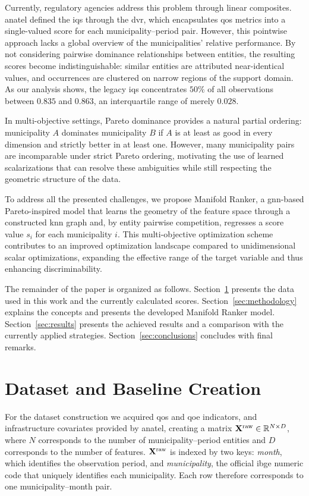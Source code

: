 \documentclass[english]{sbrt}
\begin{document}
Currently, regulatory agencies address this problem through linear composites. \gls{anatel} defined the \gls{iqs} through the \gls{dvr}, which encapsulates \gls{qos} metrics into a single-valued score for each municipality--period pair. However, this pointwise approach lacks a global overview of the municipalities' relative performance. By not considering pairwise dominance relationships between entities, the resulting scores become indistinguishable: similar entities are attributed near-identical values, and occurrences are clustered on narrow regions of the support domain. As our analysis shows, the legacy \gls{iqs} concentrates $50\%$ of all observations between $0.835$ and $0.863$, an interquartile range of merely $0.028$.

In multi-objective settings, Pareto dominance provides a natural partial ordering: municipality $A$ dominates municipality $B$ if $A$ is at least as good in every dimension and strictly better in at least one. However, many municipality pairs are incomparable under strict Pareto ordering, motivating the use of learned scalarizations that can resolve these ambiguities while still respecting the geometric structure of the data.

To address all the presented challenges, we propose Manifold Ranker, a \gls{gnn}-based Pareto-inspired model that learns the geometry of the feature space through a constructed \gls{knn} graph and, by entity pairwise competition, regresses a score value $s_i$ for each municipality $i$. This multi-objective optimization scheme contributes to an improved optimization landscape compared to unidimensional scalar optimizations, expanding the effective range of the target variable and thus enhancing discriminability.

The remainder of the paper is organized as follows.
Section~\ref{sec:dataset} presents the data used in this work and the currently calculated scores.
Section~\ref{sec:methodology} explains the concepts and presents the developed Manifold Ranker model.
Section~\ref{sec:results} presents the achieved results and a comparison with the currently applied strategies.
Section~\ref{sec:conclusions} concludes with final remarks.


\section{Dataset and Baseline Creation} \label{sec:dataset}

For the dataset construction we acquired \gls{qos} and \gls{qoe} indicators, and infrastructure covariates provided by \gls{anatel},
creating a matrix $\mathbf{X}^\mathrm{raw} \in \mathbb{R}^{N \times D}$, where $N$ corresponds to the number of municipality--period entities and $D$ corresponds to the number of features.
$\mathbf{X}^\mathrm{raw}$ is indexed by two keys: \textit{month}, which identifies the observation period, 
and \textit{municipality}, the official \gls{ibge} numeric code that uniquely identifies each municipality. 
Each row therefore corresponds to one municipality--month pair.
\end{document}
